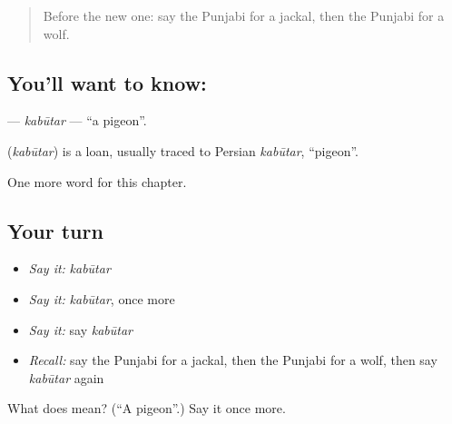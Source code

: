 \label{lesson:PA-C130-kabutar}



\begin{quote}
Before the new one: say the Punjabi for a jackal, then the Punjabi for a wolf.
\end{quote}

\subsection*{You'll want to know: }
\textbf{} — \emph{kabūtar} — \textquotedblleft{}a pigeon\textquotedblright{}.

\begin{cousinweb}
\textbf{} (\emph{kabūtar}) is a loan, usually traced to Persian \emph{kabūtar}, \textquotedblleft{}pigeon\textquotedblright{}.
\end{cousinweb}

\begin{grammarlens}[title={What you've built}]
One more word for this chapter.
\end{grammarlens}

\subsection*{Your turn}
\begin{itemize}
\raggedright
  \item \emph{Say it:} \emph{kabūtar}
  \item \emph{Say it:} \emph{kabūtar}, once more
  \item \emph{Say it:} say \emph{kabūtar}
  \item \emph{Recall:} say the Punjabi for a jackal, then the Punjabi for a wolf, then say \emph{kabūtar} again
\end{itemize}

\begin{tcolorbox}[breakable,colback=teal!4,colframe=teal!35!black,title={Before you move on}]
What does  mean? (\textquotedblleft{}A pigeon\textquotedblright{}.) Say it once more.
\end{tcolorbox}
